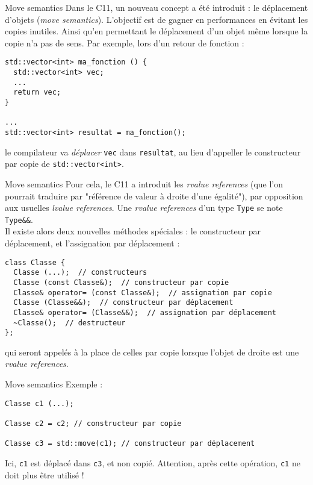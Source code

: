 \documentclass[c]{beamer}
\newcommand{\inline}[1]{\texttt{#1}}
\newcommand{\cpp}{\mbox{C\vspace{.5em}\protect\raisebox{.2ex}{\footnotesize++}}}
\begin{document}

\begin{frame}{}
\partpage
\end{frame}

\begin{frame}[fragile]{Move semantics}
Dans le \cpp11, un nouveau concept a été introduit : le déplacement d'objets (\textit{move semantics}). L'objectif est de gagner en performances en évitant les copies inutiles. Ainsi qu'en permettant le déplacement d'un objet même lorsque la copie n'a pas de sens. Par exemple, lors d'un retour de fonction :
\begin{verbatim}
std::vector<int> ma_fonction () {
  std::vector<int> vec;
  ...
  return vec;
}

...
std::vector<int> resultat = ma_fonction();
\end{verbatim}
le compilateur va \emph{déplacer} \texttt{vec} dans \texttt{resultat}, au lieu d'appeller le constructeur par copie de \inline{std::vector<int>}.
\end{frame}

\begin{frame}[fragile]{Move semantics}
Pour cela, le \cpp11 a introduit les \textit{rvalue references} (que l'on pourrait traduire par "référence de valeur à droite d'une égalité"), par opposition aux usuelles \textit{lvalue references}. Une \textit{rvalue references} d'un type \inline{Type} se note \inline{Type&&}.\\

Il existe alors deux nouvelles méthodes spéciales : le constructeur par déplacement, et l'assignation par déplacement :
\begin{verbatim}
class Classe {
  Classe (...);  // constructeurs
  Classe (const Classe&);  // constructeur par copie
  Classe& operator= (const Classe&);  // assignation par copie
  Classe (Classe&&);  // constructeur par déplacement
  Classe& operator= (Classe&&);  // assignation par déplacement
  ~Classe();  // destructeur
};
\end{verbatim}
qui seront appelés à la place de celles par copie lorsque l'objet de droite est une \textit{rvalue references}.
\end{frame}

\begin{frame}[fragile]{Move semantics}
Exemple :
\vspace{1em}
\begin{verbatim}
Classe c1 (...);

Classe c2 = c2; // constructeur par copie

Classe c3 = std::move(c1); // constructeur par déplacement
\end{verbatim}
\vspace{1em}
Ici, \inline{c1} est déplacé dans \inline{c3}, et non copié. Attention, après cette opération, \inline{c1} ne doit plus être utilisé !
\end{frame}
\end{document}
